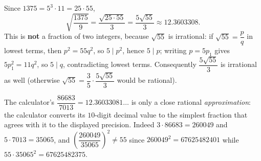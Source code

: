 Since $1375=5^3\cdot11=25\cdot55$,
\[
\sqrt{\dfrac{1375}{9}}=\dfrac{\sqrt{25\cdot55}}{3}=\boxed{\dfrac{5\sqrt{55}}{3}}\approx12.3603308 .
\]
This is \textbf{not} a fraction of two integers, because $\sqrt{55}$ is irrational: if $\sqrt{55}=\dfrac {p}{q}$ in lowest terms, then $p^2=55q^2$, so $5\mid p^2$, hence $5\mid p$; writing $p=5p_1$ gives $5p_1^2=11q^2$, so $5\mid q$, contradicting lowest terms. Consequently $\dfrac{5\sqrt{55}}{3}$ is irrational as well (otherwise $\sqrt{55}=\dfrac{3}{5}\cdot\dfrac{5\sqrt{55}}{3}$ would be rational).

The calculator's $\dfrac{86683}{7013}=12.36033081\ldots$ is only a close rational \emph{approximation}: the calculator converts its $10$-digit decimal value to the simplest fraction that agrees with it to the displayed precision. Indeed $3\cdot86683=260049$ and $5\cdot7013=35065$, and $\left(\dfrac{260049}{35065}\right)^2\ne55$ since $260049^2=67625482401$ while $55\cdot35065^2=67625482375$.
